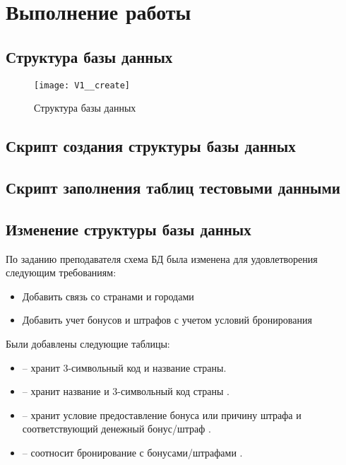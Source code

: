 \section{Выполнение работы}

\subsection{Структура базы данных}

\begin{figure}[H]
	\centering
	\texttt{[image: V1\_\_create]}
	\caption{Структура базы данных}
\end{figure}

\subsection{Скрипт создания структуры базы данных}



\subsection{Скрипт заполнения таблиц тестовыми данными}



\subsection{Изменение структуры базы данных}

По заданию преподавателя схема БД была изменена для удовлетворения следующим требованиям:

\begin{itemize}
	\item Добавить связь со странами и городами
	\item Добавить учет бонусов и штрафов с учетом условий бронирования
\end{itemize}

Были добавлены следующие таблицы:

\begin{itemize}
	\item {} -- хранит 3-символьный код  и название  страны.
	
	\item {} -- хранит название  и 3-символьный код страны .
	
	\item {} -- хранит условие предоставление бонуса или причину штрафа  и соответствующий денежный бонус/штраф .
	
	\item {} -- соотносит бронирование  с бонусами/штрафами .
\end{itemize}

